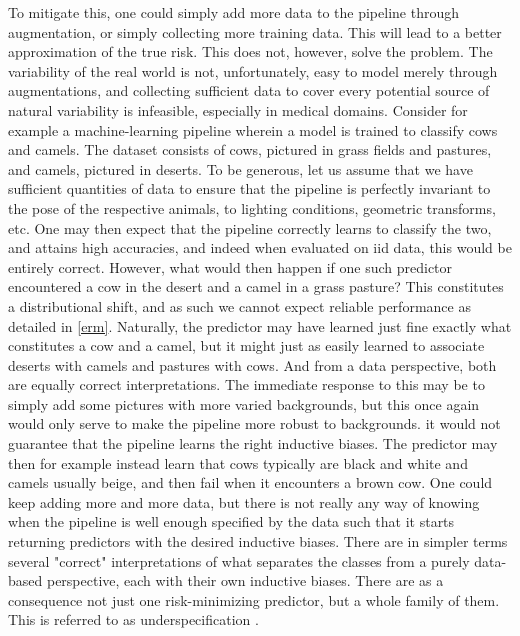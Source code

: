 	To mitigate this, one could simply add more data to the pipeline through augmentation, or simply collecting more training data. This will lead to a better approximation of the true risk. This does not, however, solve the problem. The variability of the real world is not, unfortunately, easy to model merely through augmentations, and collecting sufficient data to cover every potential source of natural variability is infeasible, especially in medical domains. 
	Consider for example a machine-learning pipeline wherein a model is trained to classify cows and camels. The dataset consists of cows, pictured in grass fields and pastures, and camels, pictured in deserts. To be generous, let us assume that we have sufficient quantities of data to ensure that the pipeline is perfectly invariant to the pose of the respective animals, to lighting conditions, geometric transforms, etc. One may then expect that the pipeline correctly learns to classify the two, and attains high accuracies, and indeed when evaluated on iid data, this would be entirely correct. However, what would then happen if one such predictor encountered a cow in the desert and a camel in a grass pasture? This constitutes a distributional shift, and as such we cannot expect reliable performance as detailed in \ref{erm}. Naturally, the predictor may have learned just fine exactly what constitutes a cow and a camel, but it might just as easily learned to associate deserts with camels and pastures with cows. And from a data perspective, both are equally correct interpretations. The immediate response to this may be to simply add some pictures with more varied backgrounds, but this once again would only serve to make the pipeline more robust to backgrounds. it would not guarantee that the pipeline learns the right inductive biases. The predictor may then for example instead learn that cows typically are black and white and camels usually beige, and then fail when it encounters a brown cow. One could keep adding more and more data, but there is not really any way of knowing when the pipeline is well enough specified by the data such that it starts returning predictors with the desired inductive biases. There are in simpler terms several "correct" interpretations of what separates the classes from a purely data-based perspective, each with their own inductive biases. There are as a consequence not just one risk-minimizing predictor, but a whole family of them. This is referred to as underspecification \cite{damour2020underspecification}.
	
	

